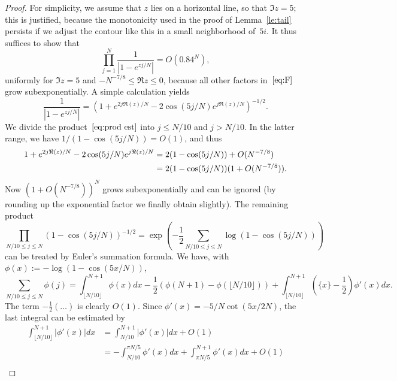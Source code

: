 \documentclass[a4paper]{amsart}
\begin{document}
\begin{proof}
For simplicity, we assume that $z$ lies on a horizontal line,
so that $\Im z=5$; this is justified, because the monotonicity
used in the proof of Lemma~\ref{le:tail} persists if we adjust the contour like
this in a small neighborhood of~$5i$.
  It thus suffices to show that
  \begin{equation}\label{eq:prod est}
      \prod_{j=1}^N \frac{1}{|1-e^{z j/N}|} = O(0.84^N),
   \end{equation}
  uniformly for $\Im z=5$ and $-N^{-7/8} \leq \Re z \leq 0$,
  because all other factors in~$\ref{eq:F}$ grow subexponentially.
  A simple calculation yields
  \begin{equation}\label{eq:abs expl}
    \frac{1}{|1-e^{z j/N}|} = \left(1+  e^{2j \Re(z)/N} - 2\cos(5j/N)
    e^{j \Re(z)/N} \right)^{-1/2}.
  \end{equation}
  We divide the product~$\ref{eq:prod est}$
  into $j\leq N/10$ and $j>N/10$. In the latter range,
  we have $1/(1-\cos(5j/N))=O(1)$, and thus
  \begin{align}
    1+  e^{2j \Re(z)/N} - 2\cos(5j/N) e^{j \Re(z)/N}
      &= 2(1-\cos(5j/N))+ O(N^{-7/8}) \notag \\
    &= 2(1-\cos(5j/N))(1+ O(N^{-7/8})). \label{eq:j big}
  \end{align}
  Now $(1+ O(N^{-7/8}))^N$ grows subexponentially and can be ignored (by rounding
  up the exponential factor we finally obtain slightly). The remaining product
  \begin{equation}\label{eq:prod sum}
    \prod_{N/10 \leq j\leq N}(1-\cos(5j/N))^{-1/2} =
    \exp\left(-\frac12 \sum_{N/10 \leq j\leq N} \log(1-\cos(5j/N)) \right)
  \end{equation}
  can be treated by Euler's summation formula.
  We have, with $\phi(x):=-\log(1-\cos(5x/N))$,
  \begin{equation}\label{eq:euler}
    \sum_{N/10 \leq j\leq N} \phi(j) = \int_{\lfloor N/10 \rfloor}^{N+1} \phi(x)dx
    -\frac12(\phi(N+1)-\phi(\lfloor N/10 \rfloor)) +
    \int_{\lfloor N/10 \rfloor}^{N+1}(\{x\}-\frac12)\phi'(x)dx.
  \end{equation}
  The term $-\tfrac12(\dots)$ is clearly $O(1)$.
  Since $\phi'(x) = -5/N \cot(5x/2N)$, the last integral can be estimated by
  \begin{align*}
    \int_{\lfloor N/10 \rfloor}^{N+1} | \phi'(x) | dx
    &= \int_{ N/10 }^{N+1} | \phi'(x) | dx  + O(1) \\
    &= -\int_{ N/10 }^{\pi N/5}\phi'(x) dx + \int_{\pi N/5}^{N+1}\phi'(x)dx +O(1) \\

\end{align*}
\end{proof}
\end{document}
